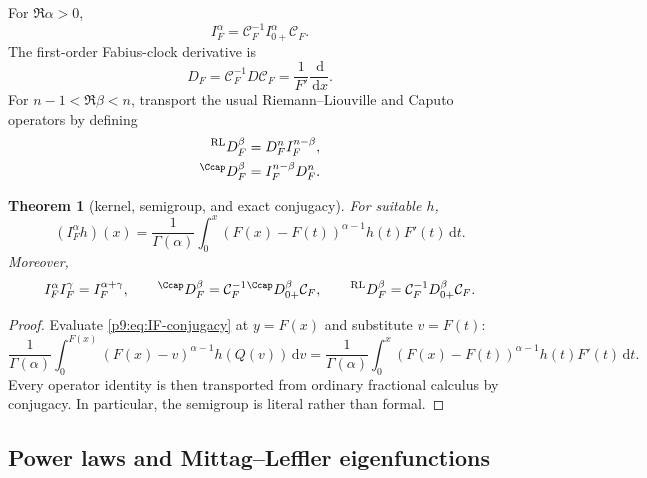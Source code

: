 \documentclass[11pt,oneside]{article}
\newtheorem{theorem}{Theorem}[section]
\theoremstyle{definition}
\theoremstyle{remark}
\newcommand{\dd}{\,\mathrm d}
\newcommand{\1}{\mathbf 1}
\begin{document}
\begin{definition}
For $\Re\alpha>0$,
\begin{equation}
 I_F^\alpha=\mathcal C_F^{-1}I_{0+}^\alpha\mathcal C_F.
 \label{p9:eq:IF-conjugacy}
\end{equation}
The first-order Fabius-clock derivative is
\begin{equation}
 D_F=\mathcal C_F^{-1}D\mathcal C_F
 =\frac1{F'}\frac{\dd}{\dd x}.
 \label{p9:eq:DF-conjugacy}
\end{equation}
For $n-1<\Re\beta<n$, transport the usual Riemann--Liouville and Caputo
operators \cite{p9:Caputo1967,p9:Podlubny} by defining
\begin{align}
 {}^{\mathrm{RL}}D_F^\beta
 &=D_F^nI_F^{n-\beta},
 \label{p9:eq:RL-DF}\\
 {}^{\Ccap}D_F^\beta
 &=I_F^{n-\beta}D_F^n.
 \label{p9:eq:Caputo-DF}
\end{align}
\end{definition}

\begin{theorem}[kernel, semigroup, and exact conjugacy]
For suitable $h$,
\begin{equation}
 (I_F^\alpha h)(x)
 =\frac1{\Gamma(\alpha)}
 \int_0^x(F(x)-F(t))^{\alpha-1}h(t)F'(t)\dd t.
 \label{p9:eq:IF-kernel}
\end{equation}
Moreover,
\begin{equation}
 I_F^\alpha I_F^\gamma=I_F^{\alpha+\gamma},
 \qquad
 {}^{\Ccap}D_F^\beta
 =\mathcal C_F^{-1}{}^{\Ccap}D_{0+}^\beta\mathcal C_F,
 \qquad
 {}^{\mathrm{RL}}D_F^\beta
 =\mathcal C_F^{-1}D_{0+}^\beta\mathcal C_F.
 \label{p9:eq:F-clock-conjugacies}
\end{equation}
\end{theorem}

\begin{proof}
Evaluate \cref{p9:eq:IF-conjugacy} at $y=F(x)$ and substitute $v=F(t)$:
\[
 \frac1{\Gamma(\alpha)}\int_0^{F(x)}
 (F(x)-v)^{\alpha-1}h(Q(v))\dd v
 =\frac1{\Gamma(\alpha)}\int_0^x
 (F(x)-F(t))^{\alpha-1}h(t)F'(t)\dd t.
\]
Every operator identity is then transported from ordinary fractional calculus
by conjugacy.  In particular, the semigroup is literal rather than formal.
\end{proof}

\subsection{Power laws and Mittag--Leffler eigenfunctions}
\end{document}
